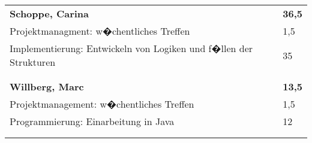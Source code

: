 \documentclass[a4paper,11pt]{scrartcl}
\begin{document}
\begin{longtable}{| p{13.8cm} | C{2.4cm} |}

	&

	\\
	\hline
	\hline


	\textbf{Schoppe, Carina} & \textbf{36,5}\\ %
	\hline

  Projektmanagment: w�chentliches Treffen
	&
  1,5
	\\
	\hline

  Implementierung: Entwickeln von Logiken und f�llen der Strukturen
	&
	35
	\\
	\hline


	&

	\\
	\hline


	&

	\\
	\hline
	\hline


	\textbf{Willberg, Marc} & \textbf{13,5}\\ %
	\hline

  Projektmanagement: w�chentliches Treffen
	&
  1,5
	\\
	\hline

  Programmierung: Einarbeitung in Java
	&
  12
	\\
	\hline


	&

	\\
	\hline


	&

	\\
	\hline

\end{longtable}
\end{document}
